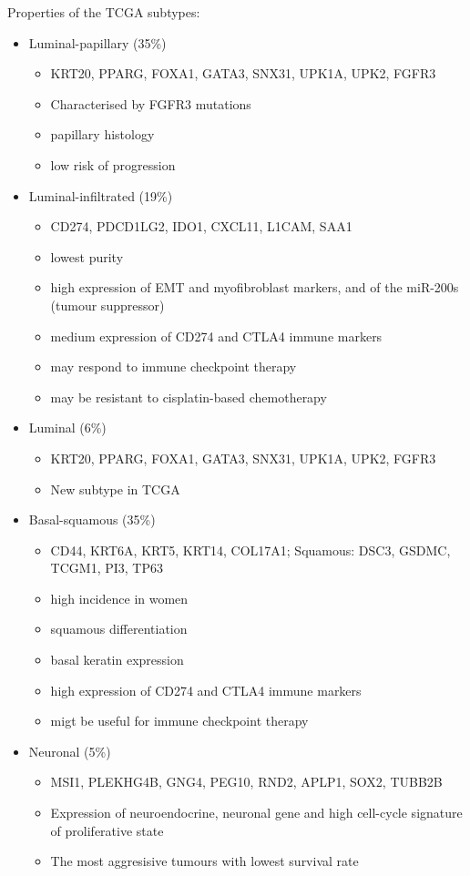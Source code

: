 Properties of the TCGA subtypes:
\begin{itemize}
    \item Luminal-papillary (35\%)
    \begin{itemize}
        \item KRT20, PPARG, FOXA1, GATA3, SNX31, UPK1A, UPK2, FGFR3
        \item Characterised by FGFR3 mutations
        \item papillary histology
        \item low risk of progression
    \end{itemize}
    \item Luminal-infiltrated (19\%)
    \begin{itemize}
        \item CD274, PDCD1LG2, IDO1, CXCL11, L1CAM, SAA1
        \item lowest purity
        \item high expression of EMT and myofibroblast markers, and of the miR-200s (tumour suppressor) 
        \item medium expression of CD274 and CTLA4 immune markers
        \item may respond to immune checkpoint therapy
        \item may be resistant to cisplatin-based chemotherapy
    \end{itemize}
    \item Luminal (6\%)
    \begin{itemize}
        \item KRT20, PPARG, FOXA1, GATA3, SNX31, UPK1A, UPK2, FGFR3
        \item New subtype in TCGA
    \end{itemize}
    \item Basal-squamous (35\%)
    \begin{itemize}
        \item CD44, KRT6A, KRT5, KRT14, COL17A1; Squamous: DSC3, GSDMC, TCGM1, PI3, TP63
        \item high incidence in women
        \item squamous differentiation
        \item basal keratin expression
        \item high expression of CD274 and CTLA4 immune markers
        \item migt be useful for immune checkpoint therapy
    \end{itemize}
    \item Neuronal (5\%)
    \begin{itemize}
        \item MSI1, PLEKHG4B, GNG4, PEG10, RND2, APLP1, SOX2, TUBB2B 
        \item Expression of neuroendocrine, neuronal gene and high cell-cycle signature of proliferative state
        \item The most aggresisive tumours with lowest survival rate
    \end{itemize}
\end{itemize}

